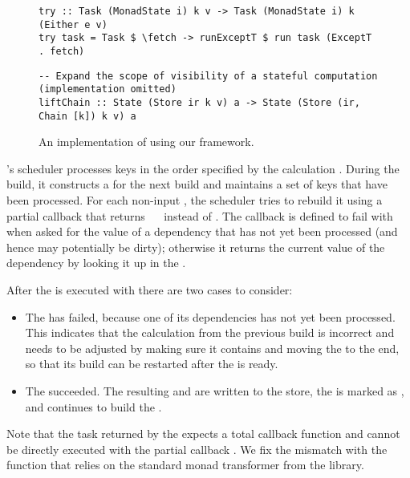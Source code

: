 \begin{figure}
\begin{verbatim}
try :: Task (MonadState i) k v -> Task (MonadState i) k (Either e v)
try task = Task $ \fetch -> runExceptT $ run task (ExceptT . fetch)
\end{verbatim}
\vspace{0mm}
\begin{verbatim}
-- Expand the scope of visibility of a stateful computation (implementation omitted)
liftChain :: State (Store ir k v) a -> State (Store (ir, Chain [k]) k v) a
\end{verbatim}
\vspace{-3mm}
\caption{An implementation of \Excel using our framework.}\label{fig-excel-implementation}
\vspace{-5mm}
\end{figure}

\Excel's  scheduler processes keys in the order specified by the
calculation . During the build, it constructs a  for the
next build and maintains a set of keys  that have been processed. For
each non-input , the scheduler tries to rebuild it using a partial
 callback that returns ~~ instead of .
The callback is defined to fail with ~ when asked for the value
of a dependency  that has not yet been processed (and hence may
potentially be dirty); otherwise it returns the current value of the dependency
by looking it up in the .

After the  is executed with  there are two cases to
consider:

\begin{itemize}
    \item The  has failed, because one of its dependencies 
    has not yet been processed. This indicates that the calculation 
    from the previous build is incorrect and needs to be adjusted by making sure
    it contains  and moving the  to the end, so that its build
    can be restarted after the  is ready.
    \item The  succeeded. The resulting  and
     are written to the store, the  is marked as ,
    and \Excel continues to build the .
\end{itemize}

Note that the task returned by the  expects a total callback
function and cannot be directly executed with the partial callback .
We fix the mismatch with the function  that relies on the standard
monad transformer  from the  library.

